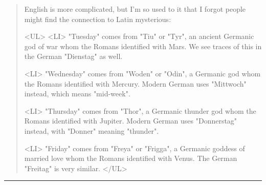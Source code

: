 \begin{quote}
English is more complicated, but I'm so used to it that I forgot 
people might find the connection to Latin mysterious:

<UL>
<LI>
"Tuesday" comes from 
"Tiu" or "Tyr", an ancient Germanic god of war whom 
the Romans identified with Mars.  We see traces of this in the German 
"Dienstag" as well.

<LI>
"Wednesday" comes from "Woden" or 
"Odin", a Germanic god whom the Romans
identified with Mercury.  Modern German uses "Mittwoch" 
instead, which means "mid-week".
 
<LI>
"Thursday" comes from "Thor", 
a Germanic thunder god whom the Romans 
identified with Jupiter.  Modern German uses "Donnerstag" instead,
with "Donner" meaning "thunder".

<LI>
"Friday" comes from "Freya" or 
"Frigga", a Germanic goddess of married love whom
the Romans identified with Venus.  The German "Freitag" 
is very similar.
</UL>

\end{quote}


\par\noindent\rule{\textwidth}{0.4pt}
